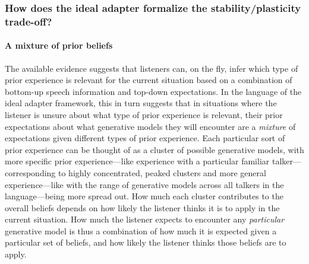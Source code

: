 \subsubsection{How does the ideal adapter formalize the stability/plasticity trade-off?}
\label{sec:how-does-ideal}

\paragraph{A mixture of prior beliefs}
\label{sec:mixt-prior-beli}

The available evidence suggests that listeners can, on the fly, infer which type of prior experience is relevant for the current situation based on a combination of bottom-up speech information and top-down expectations.  In the language of the ideal adapter framework, this in turn suggests that in situations where the listener is unsure about what type of prior experience is relevant, their prior expectations about what generative models they will encounter are a \emph{mixture} of expectations given different types of prior experience.  Each particular sort of prior experience can be thought of as a cluster of possible generative models, with more specific prior experience---like experience with a particular familiar talker---corresponding to highly concentrated, peaked clusters and more general experience---like with the range of generative models across all talkers in the language---being more spread out.  
How much each cluster contributes to the overall beliefs depends on how likely the listener thinks it is to apply in the current situation.  How much the listener expects to encounter any \emph{particular} generative model is thus a combination of how much it is expected given a particular set of beliefs, and how likely the listener thinks those beliefs are to apply.  


